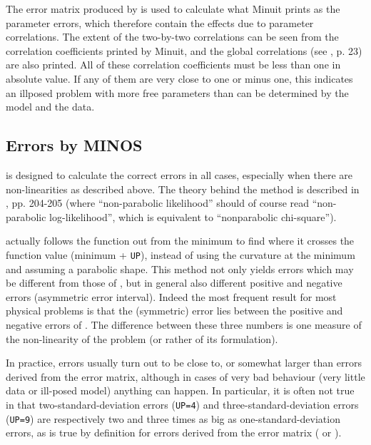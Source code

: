 The error matrix produced by  is used to calculate what Minuit 
prints as the parameter errors, which therefore contain the effects 
due to parameter correlations. The extent of the two-by-two 
correlations can be seen from the correlation coefficients printed by 
Minuit, and the global correlations (see \cite{bib-EADIE}, p. 23) are also 
printed. All of these correlation coefficients must be less than one 
in absolute value. If any of them are very close to one or minus one, 
this indicates an illposed problem with more free parameters than 
can be determined by the model and the data.
 
\subsection{Errors by MINOS}
 
 is designed to calculate the correct errors in all cases, 
especially when there are non-linearities as described above. The 
theory behind the method is described in \cite{bib-EADIE}, pp. 204-205 
(where ``non-parabolic likelihood'' should of course read 
``non-parabolic log-likelihood'', 
which is equivalent to ``nonparabolic chi-square'').
 
 actually follows the function out from the minimum to find 
where it crosses the function value (minimum + \texttt{UP}), instead of using 
the curvature at the minimum and assuming a parabolic shape. This 
method not only yields errors which may be different from those of 
, but in general also different positive and negative errors 
(asymmetric error interval). Indeed the most frequent result for 
most physical problems is that the (symmetric)  error lies 
between the positive and negative errors of . The difference 
between these three numbers is one measure of the non-linearity of 
the problem (or rather of its formulation).
 
In practice,  errors usually turn out to be close to, or 
somewhat larger than errors derived from the error matrix, although 
in cases of very bad behaviour (very little data or ill-posed model) 
anything can happen. In particular, it is often not
true in  that two-standard-deviation errors 
(\texttt{UP=4}) and three-standard-deviation  errors (\texttt{UP=9}) 
are respectively two and three times as big as one-standard-deviation errors, 
as is true by definition for errors derived from the 
error matrix ( or ).

